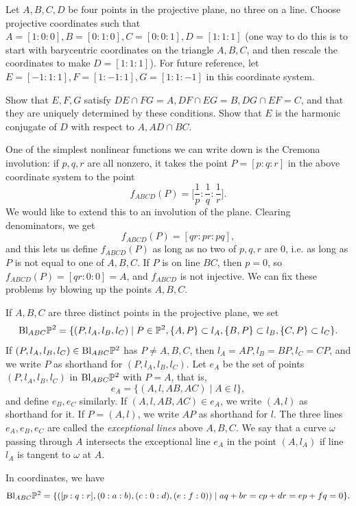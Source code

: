 Let $A,B,C,D$ be four points in the projective plane, no three on a line. Choose projective coordinates such that $A = [1:0:0], B = [0:1:0], C = [0:0:1], D = [1:1:1]$ (one way to do this is to start with barycentric coordinates on the triangle $A,B,C$, and then rescale the coordinates to make $D = [1:1:1]$). For future reference, let $E = [-1:1:1], F = [1:-1:1], G = [1:1:-1]$ in this coordinate system.

\begin{exer} Show that $E,F,G$ satisfy $DE \cap FG = A, DF \cap EG = B, DG \cap EF = C$, and that they are uniquely determined by these conditions. Show that $E$ is the harmonic conjugate of $D$ with respect to $A, AD\cap BC$.
\end{exer}

One of the simplest nonlinear functions we can write down is the Cremona involution: if $p,q,r$ are all nonzero, it takes the point $P = [p:q:r]$ in the above coordinate system to the point
\[
f_{ABCD}(P) = \Big[\frac{1}{p}:\frac{1}{q}:\frac{1}{r}\Big].
\]
We would like to extend this to an involution of the plane. Clearing denominators, we get
\[
f_{ABCD}(P) = [qr:pr:pq],
\]
and this lets us define $f_{ABCD}(P)$ as long as no two of $p,q,r$ are $0$, i.e. as long as $P$ is not equal to one of $A,B,C$. If $P$ is on line $BC$, then $p=0$, so $f_{ABCD}(P) = [qr:0:0] = A$, and $f_{ABCD}$ is not injective. We can fix these problems by blowing up the points $A,B,C$.

\begin{defn} If $A,B,C$ are three distinct points in the projective plane, we set
\[
\text{\rm Bl}_{ABC}\mathbb{P}^2 = \{(P,l_A,l_B,l_C)\mid P \in \mathbb{P}^2, \{A,P\} \subset l_A, \{B,P\} \subset l_B, \{C,P\} \subset l_C\}.
\]
If $(P,l_A,l_B,l_C) \in \text{\rm Bl}_{ABC}\mathbb{P}^2$ has $P \ne A,B,C$, then $l_A = AP, l_B = BP, l_C = CP$, and we write $P$ as shorthand for $(P,l_A,l_B,l_C)$. Let $e_A$ be the set of points $(P,l_A,l_B,l_C)$ in $\text{\rm Bl}_{ABC}\mathbb{P}^2$ with $P = A$, that is,
\[
e_A = \{(A,l,AB,AC) \mid A\in l\},
\]
and define $e_B, e_C$ similarly. If $(A,l,AB,AC)\in e_A$, we write $(A,l)$ as shorthand for it. If $P = (A,l)$, we write $AP$ as shorthand for $l$. The three lines $e_A, e_B, e_C$ are called the \emph{exceptional lines} above $A,B,C$. We say that a curve $\omega$ passing through $A$ intersects the exceptional line $e_A$ in the point $(A,l_A)$ if line $l_A$ is tangent to $\omega$ at $A$.
\end{defn}

In coordinates, we have
\[
\text{\rm Bl}_{ABC}\mathbb{P}^2 = \{([p:q:r],(0:a:b),(c:0:d),(e:f:0))\mid aq+br = cp+dr = ep+fq = 0\}.
\]

